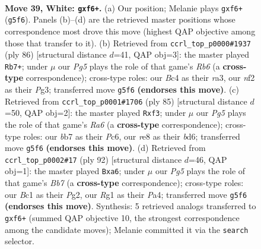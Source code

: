 \documentclass[11pt]{article}
\begin{document}
\clearpage

\begin{figure}[p]\centering
\begin{subfigure}{0.46\textwidth}\centering
\resizebox{\linewidth}{!}{%
\newchessgame
\chessboard[
  setfen={4r3/pb1p2k1/8/5pP1/2B5/8/PPK2n2/2B3R1 w - f6 0 39},
  showmover=false,
  pgfstyle=straightmove, color=movearrow, markmove={g5-f6}
]}
\caption{}
\end{subfigure}\hfill
\begin{subfigure}{0.46\textwidth}\centering
\resizebox{\linewidth}{!}{%
\newchessgame
\chessboard[
  setfen={8/4k3/PR6/8/1P1pp1b1/r5P1/7P/5BK1 w - - 1 44},
  showmover=false,
  pgfstyle=straightmove, color=movearrow, markmove={b6-b7}
]}
\caption{}
\end{subfigure}
\\[4pt]
\begin{subfigure}{0.46\textwidth}\centering
\resizebox{\linewidth}{!}{%
\newchessgame
\chessboard[
  setfen={6k1/6p1/1RpB1b2/p1P2Pp1/8/r4P2/3K4/8 b - - 13 43},
  showmover=false,
  pgfstyle=straightmove, color=movearrow, markmove={a3-f3}
]}
\caption{}
\end{subfigure}\hfill
\begin{subfigure}{0.46\textwidth}\centering
\resizebox{\linewidth}{!}{%
\newchessgame
\chessboard[
  setfen={7k/1Bp5/p6p/2P1r3/P5b1/8/1R4P1/6K1 w - - 0 47},
  showmover=false,
  pgfstyle=straightmove, color=movearrow, markmove={b7-a6}
]}
\caption{}
\end{subfigure}
\caption{\textbf{Move 39, White: \texttt{gxf6+}.} (a) Our position; Melanie plays \texttt{gxf6+} (\texttt{g5f6}). Panels (b)--(d) are the retrieved master positions whose correspondence most drove this move (highest QAP objective among those that transfer to it). (b) Retrieved from \texttt{ccrl\_top\_p0000\#1937} (ply 86) [structural distance $d$=41, QAP obj=3]: the master played \texttt{Rb7+}; under $\mu$ our \emph{Pg5} plays the role of that game's \emph{Rb6} (a \textbf{cross-type} correspondence); cross-type roles: our \emph{B}c4 as their \emph{r}a3, our \emph{n}f2 as their \emph{P}g3; transferred move \texttt{g5f6} \textbf{(endorses this move)}. (c) Retrieved from \texttt{ccrl\_top\_p0001\#1706} (ply 85) [structural distance $d$=50, QAP obj=2]: the master played \texttt{Rxf3}; under $\mu$ our \emph{Pg5} plays the role of that game's \emph{Ra6} (a \textbf{cross-type} correspondence); cross-type roles: our \emph{b}b7 as their \emph{P}c6, our \emph{r}e8 as their \emph{b}d6; transferred move \texttt{g5f6} \textbf{(endorses this move)}. (d) Retrieved from \texttt{ccrl\_top\_p0002\#17} (ply 92) [structural distance $d$=46, QAP obj=1]: the master played \texttt{Bxa6}; under $\mu$ our \emph{Pg5} plays the role of that game's \emph{Bb7} (a \textbf{cross-type} correspondence); cross-type roles: our \emph{B}c1 as their \emph{P}g2, our \emph{R}g1 as their \emph{P}a4; transferred move \texttt{g5f6} \textbf{(endorses this move)}. Synthesis: 5 retrieved analogs transferred to \texttt{gxf6+} (summed QAP objective 10, the strongest correspondence among the candidate moves); Melanie committed it via the \texttt{search} selector.}
\label{fig:thought-m76}
\end{figure}
\end{document}
